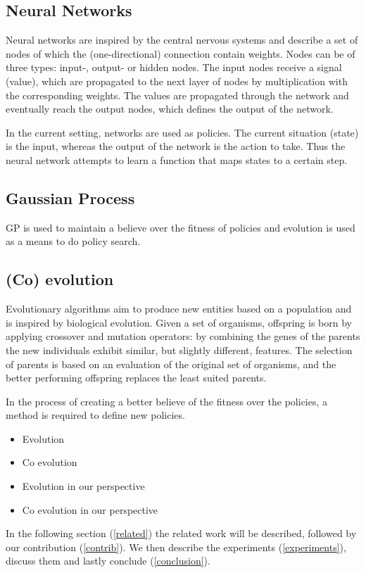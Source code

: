 \subsection{Neural Networks}
Neural networks are inspired by the central nervous systems and describe a set of nodes of which the (one-directional) connection contain weights. Nodes can be of three types: input-, output- or hidden nodes. The input nodes receive a signal (value), which are propagated to the next layer of nodes by multiplication with the corresponding weights. The values are propagated through the network and eventually reach the output nodes, which defines the output of the network. 

In the current setting, networks are used as policies. The current situation (state) is the input, whereas the output of the network is the action to take. Thus the neural network attempts to learn a function that maps states to a certain step.

\subsection{Gaussian Process}

GP is used to maintain a believe over the fitness of policies and evolution is used as a means to do policy search.

\subsection{(Co) evolution}
Evolutionary algorithms aim to produce new entities based on a population and is inspired by biological evolution. Given a set of organisms, offspring is born by applying crossover and mutation operators: by combining the genes of the parents the new individuals exhibit similar, but slightly different, features. The selection of parents is based on an evaluation of the original set of organisms, and the better performing offspring replaces the least suited parents. 


In the process of creating a better believe of the fitness over the policies, a method is required to define new policies.


\begin{itemize}
  \item{Evolution}
  \item{Co evolution}
  \item{Evolution in our perspective}
  \item{Co evolution in our perspective}
\end{itemize}

In the following section (\ref{related}) the related work will be described, followed by our contribution (\ref{contrib}). We then describe the experiments (\ref{experiments}), discuss them and lastly conclude (\ref{conclusion}).

